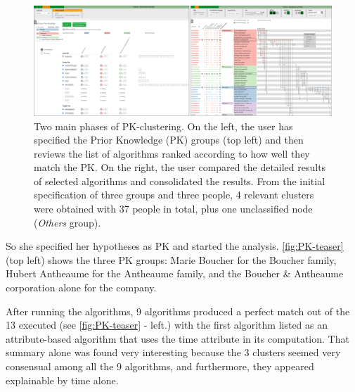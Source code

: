 \begin{figure}
  \centering
  \includegraphics[width=\linewidth]{static/figures/PK-Clustering/VISPaperFigures/teaser_new.png}
  \caption{Two main phases of PK-clustering. On the left, the user has specified the Prior Knowledge (PK) groups (top left) and then reviews the list of algorithms ranked according to how well they match the PK. On the right, the user compared the detailed results of selected algorithms and consolidated the results. From the initial specification of three groups and three people, 4 relevant clusters were obtained with 37 people in total, plus one unclassified node (\textit{Others} group).}
	\label{fig:PK-teaser}
\end{figure}

So she specified her hypotheses as PK and started the analysis. \autoref{fig:PK-teaser} (top left) shows the three PK groups: Marie Boucher for the Boucher family, Hubert Antheaume for the Antheaume family, and the Boucher \& Antheaume corporation alone for the company.

After running the algorithms, 9 algorithms produced a perfect match out of the 13 executed (see \autoref{fig:PK-teaser} - left.) with the first algorithm listed as an attribute-based algorithm that uses the time attribute in its computation. That summary alone was found very interesting because the 3 clusters seemed very consensual among all the 9 algorithms, and furthermore, they appeared explainable by time alone.


